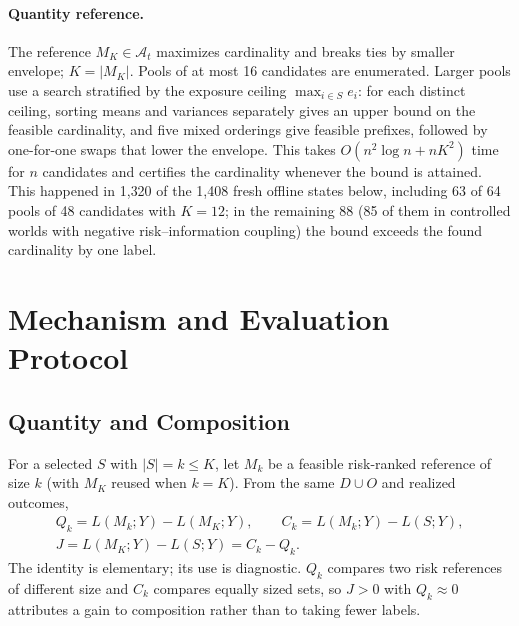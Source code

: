 \documentclass[runningheads]{llncs}
\begin{document}
\paragraph{Quantity reference.} The reference $M_K\in\mathcal A_t$ maximizes cardinality and breaks ties by smaller envelope; $K=|M_K|$. Pools of at most 16 candidates are enumerated. Larger pools use a search stratified by the exposure ceiling $\max_{i\in S}e_i$: for each distinct ceiling, sorting means and variances separately gives an upper bound on the feasible cardinality, and five mixed orderings give feasible prefixes, followed by one-for-one swaps that lower the envelope. This takes $O(n^2\log n+nK^2)$ time for $n$ candidates and certifies the cardinality whenever the bound is attained. This happened in 1{,}320 of the 1{,}408 fresh offline states below, including 63 of 64 pools of 48 candidates with $K=12$; in the remaining 88 (85 of them in controlled worlds with negative risk--information coupling) the bound exceeds the found cardinality by one label.

\section{Mechanism and Evaluation Protocol}
\label{sec:mechanism}
\subsection{Quantity and Composition}
For a selected $S$ with $|S|=k\le K$, let $M_k$ be a feasible risk-ranked reference of size $k$ (with $M_K$ reused when $k=K$). From the same $D\cup O$ and realized outcomes,
\begin{equation}
\begin{gathered}
 Q_k=L(M_k;Y)-L(M_K;Y),\qquad C_k=L(M_k;Y)-L(S;Y),\\
 J=L(M_K;Y)-L(S;Y)=C_k-Q_k.
\end{gathered}
 \label{eq:decomposition}
\end{equation}
The identity is elementary; its use is diagnostic. $Q_k$ compares two risk references of different size and $C_k$ compares equally sized sets, so $J>0$ with $Q_k\approx0$ attributes a gain to composition rather than to taking fewer labels.
\end{document}
